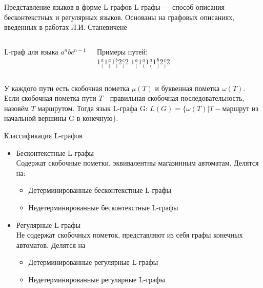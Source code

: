 \documentclass{beamer}
\begin{document}
\begin{frame}{Представление языков в форме L-графов}
L-графы --- способ описания бесконтекстных и регулярных языков. Основаны на графовых описаниях, введенных в работах Л.И. Станевичене
\begin{columns}
    L-граф для языка $a^nbc^{n-1}$
    Примеры путей:\\
    \LARGE{$1\frac{a}{(}1\frac{a}{(}1\frac{b}{)}2\frac{c}{)}2$}
    \vspace{0.8cm}
    \LARGE{$1\frac{a}{(}1\frac{a}{(}1\frac{a}{(}1\frac{b}{)}2\frac{c}{)}2$}\\
\end{columns}
У каждого пути есть скобочная пометка $\mu(T)$ и буквенная пометка $\omega(T)$. Если скобочная пометка пути $T$ - правильная скобочная последовательность, назовём $T$ маршрутом. Тогда язык L-графа G: $L(G) = \{\omega(T)|T-$маршрут из начальной вершины G в конечную$\}$.
\end{frame}

\begin{frame} {Классификация L-графов}
\begin{itemize}
  \item Бесконтекстные L-графы\\
    Содержат скобочные пометки, эквивалентны магазинным автоматам. Делятся на:
    \begin{itemize}
      \item Детерминированные бесконтекстные L-графы
      \item Недетерминированные бесконтекстные L-графы
    \end{itemize}
  \item Регулярные L-графы\\
  Не содержат скобочных пометок, представляют из себя графы конечных автоматов. Делятся на\\
  \begin{itemize}
    \item Детерминированные регулярные L-графы
    \item Недетерминированные регулярные L-графы
  \end{itemize}
\end{itemize}
\end{frame}
\end{document}
